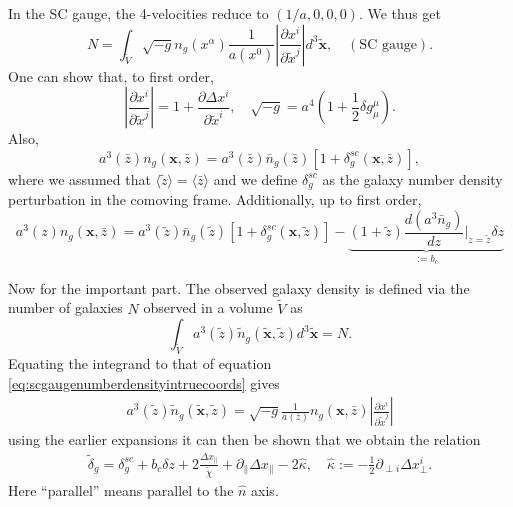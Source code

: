 \documentclass[11pt]{book}
\newcommand{\br}[1]{\ensuremath{\left( #1 \right)}}
\begin{document}
In the SC gauge, the 4-velocities reduce to $(1/a, 0, 0, 0)$. We thus get
\begin{equation}
    N = \int_{\tilde V}\sqrt{-g}n_g(x^\alpha)\frac{1}{a(x^0)}\left |\frac{\partial x^i}{\partial \tilde x^j}\right | d^3\tilde {\mathbf x}, \quad (\text{SC gauge}).
    \label{eq:scgaugenumberdensityintruecoords}
\end{equation}
One can show that, to first order,
\begin{equation}
    \left | \frac{\partial x^i}{\partial \tilde x^j} \right | = 1 + \frac{\partial \Delta x^i}{\partial \tilde x^i}, \quad \sqrt{-g} = a^4\br{1 + \frac{1}{2}\delta g^\mu_\mu}.
\end{equation}
Also,
\begin{equation}
    a^3(\bar z) n_g(\mathbf x, \bar z) = a^3(\bar z)\bar n_g(\bar z)[1+\delta_g^{sc}(\mathbf x, \bar z)],
\end{equation}
where we assumed that $\langle \tilde z \rangle = \langle \bar z \rangle$ and we define $\delta_g^{sc}$ as the galaxy number density perturbation in the comoving frame.
Additionally, up to first order,
\begin{equation}
    a^3(z)n_g(\mathbf x, \bar z) = a^3(\tilde z)\bar n_g(\tilde z)[1+\delta_g^{sc}(\mathbf x, \tilde z)] - \underbrace{(1+\tilde z)\frac{d(a^3\bar n_g)}{d z}\Big |_{z=\tilde z}\delta z}_{:=b_c}
\end{equation}

Now for the important part. The observed galaxy density is defined via the number of galaxies $N$ observed in a volume $\tilde V$ as
\begin{equation}
    \int_{\tilde V}a^3(\tilde z)\tilde n_g(\tilde {\mathbf x}, \tilde z) d^3\tilde{\mathbf x} = N.
\end{equation}
Equating the integrand to that of equation \ref{eq:scgaugenumberdensityintruecoords} gives
\begin{gather}
    a^3(\tilde z)\tilde n_g(\tilde{\mathbf x}, \tilde z) = \sqrt{-g}\frac{1}{a(\bar z)} n_g(\mathbf x, \bar z)\left | \frac{\partial x^i}{\partial\tilde x^j} \right |
\end{gather}
using the earlier expansions it can then be shown that we obtain the relation
\begin{gather}
    \tilde \delta_g = \delta^{sc}_g + b_c\delta z + 2\frac{\Delta x_\parallel}{\tilde \chi} + \partial_{\parallel}\Delta x_\parallel - 2\hat \kappa, \quad \hat \kappa := -\frac{1}{2}\partial_{\perp i}\Delta x^i_{\perp}.
    \label{eq:relcorrrealspace}
\end{gather}
Here ``parallel'' means parallel to the $\hat n$ axis.
\end{document}
